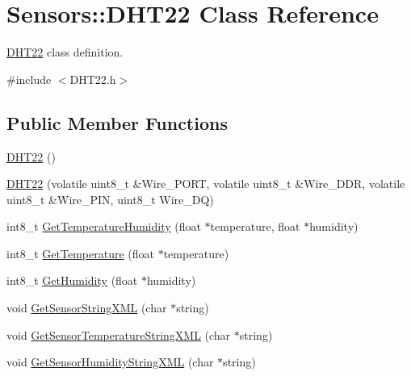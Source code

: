 \hypertarget{classSensors_1_1DHT22}{}\section{Sensors\+:\+:D\+H\+T22 Class Reference}
\label{classSensors_1_1DHT22}


\hyperlink{classSensors_1_1DHT22}{D\+H\+T22} class definition.  




{\ttfamily \#include $<$D\+H\+T22.\+h$>$}

\subsection*{Public Member Functions}
\begin{DoxyCompactItemize}
\item 
\hyperlink{classSensors_1_1DHT22_aea0dffd84011c7e41e7a9741ba94ba77}{D\+H\+T22} ()
\item 
\hyperlink{classSensors_1_1DHT22_a3eedb9d60ca7bf7775b55f48f5f686be}{D\+H\+T22} (volatile uint8\+\_\+t \&Wire\+\_\+\+P\+O\+RT, volatile uint8\+\_\+t \&Wire\+\_\+\+D\+DR, volatile uint8\+\_\+t \&Wire\+\_\+\+P\+IN, uint8\+\_\+t Wire\+\_\+\+DQ)
\item 
int8\+\_\+t \hyperlink{classSensors_1_1DHT22_a19d8f961fc57ca65d26c7ed2e814dfe6}{Get\+Temperature\+Humidity} (float $\ast$temperature, float $\ast$humidity)
\item 
int8\+\_\+t \hyperlink{classSensors_1_1DHT22_ac4401b7197dcaaab5b5b89a3ccedc103}{Get\+Temperature} (float $\ast$temperature)
\item 
int8\+\_\+t \hyperlink{classSensors_1_1DHT22_a98c4c72a0f831bb8f3142081f8a1b685}{Get\+Humidity} (float $\ast$humidity)
\item 
void \hyperlink{classSensors_1_1DHT22_a7f720c4ef52d3143142a5b7454ba0129}{Get\+Sensor\+String\+X\+ML} (char $\ast$string)
\item 
void \hyperlink{classSensors_1_1DHT22_ac3673871317c9d57f99d032bca544dd7}{Get\+Sensor\+Temperature\+String\+X\+ML} (char $\ast$string)
\item 
void \hyperlink{classSensors_1_1DHT22_aa3424d261995128db6f8ae9ecd5cbea7}{Get\+Sensor\+Humidity\+String\+X\+ML} (char $\ast$string)
\end{DoxyCompactItemize}

